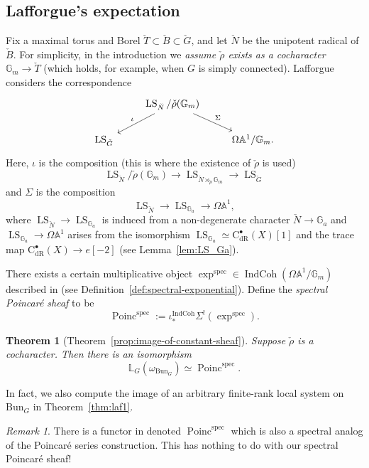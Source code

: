 \documentclass[11pt]{amsart}
\newcommand{\bG}{\mathbb{G}}
\newcommand{\bA}{\mathbb{A}}
\newcommand{\cC}{{\mathrm C}}
\newcommand{\spec}{\mathrm{spec}}
\newcommand{\dR}{\mathrm{dR}}
\newcommand{\Bun}{{\mathrm{Bun}}}
\newcommand{\Poinc}{\operatorname{Poinc}}
\DeclareMathOperator{\IndCoh}{IndCoh}
\DeclareMathOperator{\LS}{LS}
\newtheorem{thm}{Theorem}[section]
\theoremstyle{remark}
\newtheorem*{remark}{Remark}
\theoremstyle{definition}
\begin{document}
\subsection{Lafforgue's expectation}\label{subsec:intro-laff}
Fix a maximal torus and Borel $\check T\subset \check B\subset\check G$, and let $\check N$ be the unipotent radical of $\check B$. For simplicity, in the introduction we \emph{assume $\check\rho$ exists as a cocharacter $\bG_m\to\check T$} (which holds, for example, when $G$ is simply connected). Lafforgue considers the correspondence
\begin{equation}\label{eq:intro-corr}\begin{tikzcd}
    &\LS_{\check N}/\check\rho(\bG_m)\arrow[swap]{dl}{\iota}\arrow{dr}{\Sigma}\\
    \LS_{\check G}&&\Omega\bA^1/\bG_m.
\end{tikzcd}\end{equation}
Here, $\iota$ is the composition (this is where the existence of $\check\rho$ is used)
\[
\LS_{\check N}/\check\rho(\bG_m)\to\LS_{\check N\rtimes_{\check\rho}\bG_m}\to\LS_{\check G}
\]and $\Sigma$ is the composition
\[
\LS_{\check N}\to\LS_{\bG_a}\to\Omega\bA^1,
\]
where $\LS_{\check N}\to\LS_{\bG_a}$ is induced from a non-degenerate character $\check N\to\bG_a$ and $\LS_{\bG_a}\to\Omega\bA^1$ arises from the isomorphism $\LS_{\bG_a}\simeq\cC^\bullet_\dR(X)[1]$ and the trace map $\cC^\bullet_\dR(X)\to e[-2]$ (see Lemma~\ref{lem:LS_Ga}).


There exists a certain multiplicative object $\exp^\spec\in\IndCoh(\Omega\bA^1/\bG_m)$ described in \cite[\S11.6.3]{relative-langlands} (see Definition~\ref{def:spectral-exponential}). Define the \emph{spectral Poincar\'e sheaf} to be
\begin{equation}\label{intro-eq:defn-of-poinc-spec}
\Poinc^\spec:=\iota_*^{\IndCoh}\Sigma^!(\exp^\spec).
\end{equation}
\begin{thm}[Theorem~\ref{prop:image-of-constant-sheaf}]\label{intro-thm1}
    Suppose $\check\rho$ is a cocharacter. Then there is an isomorphism \[\mathbb L_G(\omega_{\Bun_G})\simeq\Poinc^\spec.\]
\end{thm}
In fact, we also compute the image of an arbitrary finite-rank local system on $\Bun_G$ in Theorem~\ref{thm:laf1}.
\begin{remark}
    There is a functor in \cite{GLC2} denoted $\Poinc^\spec$ which is also a spectral analog of the Poincar\'e series construction. This has nothing to do with our spectral Poincar\'e sheaf!
\end{remark}
\end{document}
